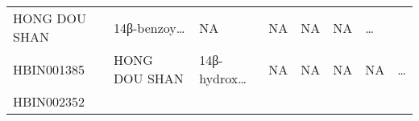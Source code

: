 \documentclass[
]{article}
\begin{document}
\begin{longtable}[]{@{}llllllll@{}}
\begin{minipage}[t]{0.11\columnwidth}
HONG DOU SHAN\strut
\end{minipage} & \begin{minipage}[t]{0.14\columnwidth}\raggedright
14β-benzoy\ldots{}\strut
\end{minipage} & \begin{minipage}[t]{0.14\columnwidth}\raggedright
NA\strut
\end{minipage} & \begin{minipage}[t]{0.08\columnwidth}\raggedright
NA\strut
\end{minipage} & \begin{minipage}[t]{0.09\columnwidth}\raggedright
NA\strut
\end{minipage} & \begin{minipage}[t]{0.11\columnwidth}\raggedright
NA\strut
\end{minipage} & \begin{minipage}[t]{0.03\columnwidth}\raggedright
\ldots{}\strut
\end{minipage}\tabularnewline
\begin{minipage}[t]{0.11\columnwidth}\raggedright
HBIN001385\strut
\end{minipage} & \begin{minipage}[t]{0.11\columnwidth}\raggedright
HONG DOU SHAN\strut
\end{minipage} & \begin{minipage}[t]{0.14\columnwidth}\raggedright
14β-hydrox\ldots{}\strut
\end{minipage} & \begin{minipage}[t]{0.14\columnwidth}\raggedright
NA\strut
\end{minipage} & \begin{minipage}[t]{0.08\columnwidth}\raggedright
NA\strut
\end{minipage} & \begin{minipage}[t]{0.09\columnwidth}\raggedright
NA\strut
\end{minipage} & \begin{minipage}[t]{0.11\columnwidth}\raggedright
NA\strut
\end{minipage} & \begin{minipage}[t]{0.03\columnwidth}\raggedright
\ldots{}\strut
\end{minipage}\tabularnewline
\begin{minipage}[t]{0.11\columnwidth}\raggedright
HBIN002352\strut
\end{minipage} & \begin{minipage}[t]{0.11\columnwidth}\raggedright

\end{minipage}
\end{longtable}
\end{document}
